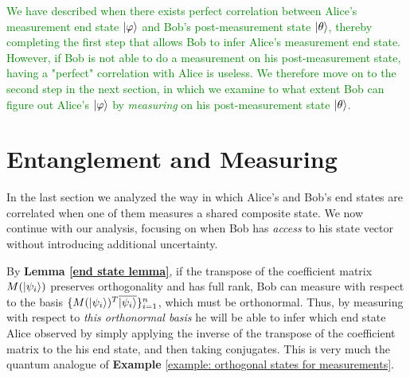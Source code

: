 \textcolor{green}{We have described when there exists perfect correlation between Alice's measurement end state $\ket{\varphi}$ and Bob's post-measurement state $\ket{\theta}$, thereby completing the first step that allows Bob to infer Alice's measurement end state. However, if Bob is not able to do a measurement on his post-measurement state, having a "perfect" correlation with Alice is useless. We therefore move on to the second step in the next section, in which we examine to what extent Bob can figure out Alice's $\ket{\varphi}$ by \emph{measuring} on his post-measurement state $\ket{\theta}$.}


\pagebreak

\section{Entanglement and Measuring}
In the last section we analyzed the way in which Alice's and Bob's end states are correlated when one of them measures a shared composite state. We now continue with our analysis, focusing on when Bob has {\emph{access}} to his state vector without introducing additional uncertainty. 

By \textbf{Lemma \ref{end state lemma}}, if the transpose of the coefficient matrix $M(\ket{\psi_i})$ preserves orthogonality and has full rank, Bob can measure with respect to the basis $\{M(\ket{\psi_i})^T \overline{\ket{\psi_i}}\}_{i=1}^n$, which must be orthonormal. Thus, by measuring with respect to {\emph{this orthonormal basis}} he will be able to infer which end state Alice observed by simply applying the inverse of the transpose of the coefficient matrix to the his end state, and then taking conjugates. This is very much the quantum analogue of {\bf{Example}} \ref{example: orthogonal states for measurements}.


